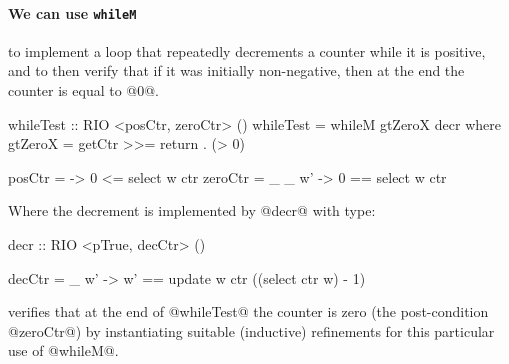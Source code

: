\paragraph{We can use \texttt{whileM}} to implement a loop that repeatedly
decrements a counter while it is positive, and to then verify that
if it was initially non-negative, then
at the end the counter is equal to @0@.
%
\begin{code}
  whileTest   :: RIO <posCtr, zeroCtr> ()
  whileTest = whileM gtZeroX decr
    where gtZeroX = getCtr >>= return . (> 0)
  
  posCtr  = \w -> 0 <= select w ctr
  zeroCtr = \_ _ w' -> 0 == select w ctr 
\end{code}
%
Where the decrement is implemented by @decr@ with type:
%
\begin{code}
  decr :: RIO <pTrue, decCtr> ()
  
  decCtr = \w _ w' -> 
    w' == update w ctr ((select ctr w) - 1)
\end{code}
\toolname verifies that at the end of @whileTest@ 
the counter is zero (\ie the post-condition @zeroCtr@)
by instantiating suitable (\ie inductive) refinements
for this particular use of @whileM@.
 






